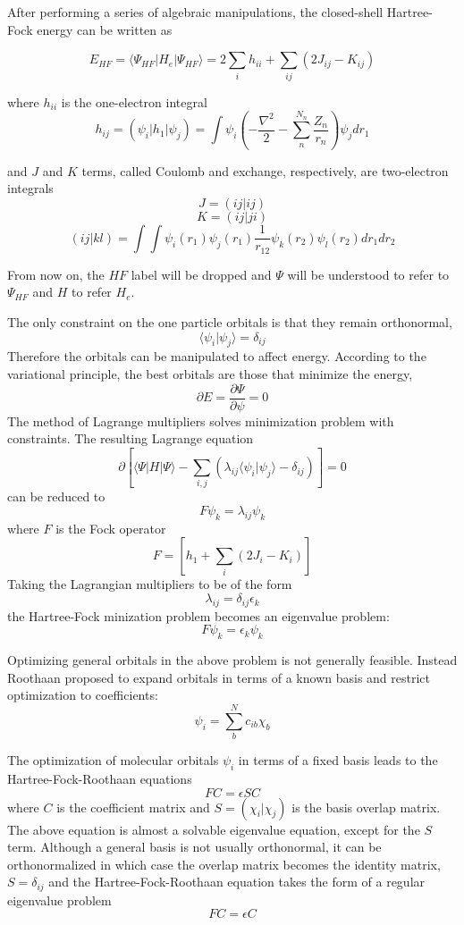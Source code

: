 \documentclass[12pt]{book} \usepackage[margin=1in]{geometry}
\newcommand{\bra}[1]{\langle #1|}
\newcommand{\ket}[1]{|#1\rangle}
\newcommand{\braket}[2]{\langle #1|#2\rangle}
\begin{document}
After performing a series of algebraic manipulations, the closed-shell
Hartree-Fock energy can be written as

$$E_{HF} =
\bra{\Psi_{HF}} H_e \ket{\Psi_{HF}} =
2 \sum_i h_{ii} + \sum_{ij} (2 J_{ij} - K_{ij})$$

where $h_{ii}$ is the one-electron integral
$$h_{ij} =
( \psi_i | h_1 | \psi_j ) = \int { \psi_i
( -\frac{\nabla^2}{2} - \sum_n^{N_n} \frac{Z_n}{r_{n}} )
 \psi_j dr_1 } $$

and $J$ and $K$ terms, called Coulomb and exchange, respectively, are
two-electron integrals
$$J = (ij|ij)$$
$$K = (ij|ji)$$
$$(ij|kl) = \int \int \psi_i(r_1) \psi_j(r_1
) \frac{1}{r_{12}}
\psi_k(r_2) \psi_l(r_2) dr_1 dr_2 $$
 

From now on, the $HF$ label will be dropped and $\Psi$ will be
understood to refer to $\Psi_{HF}$ and $H$ to refer $H_e$.


The only constraint on the one particle orbitals is that they remain
orthonormal,
$$\braket{\psi_i} {\psi_j} = \delta_{ij}$$
Therefore the orbitals can be manipulated to affect energy.
According to the variational principle, the best orbitals are those that
minimize the energy,
$$\partial{E} = \frac{\partial \Psi}{\partial \psi} = 0$$
The method of Lagrange multipliers solves minimization problem with
constraints.  The resulting Lagrange equation
$$ \partial [
\bra{\Psi} H \ket{\Psi} -
\sum_{i,j} ( \lambda_{ij} \braket{\psi_i}{\psi_j} - \delta_{ij} )
] = 0$$
can be reduced to
$$F \psi_k = \lambda_{ij} \psi_k$$
where $F$ is the Fock operator
$$F = [h_1 + \sum_i (2 J_i - K_i)]$$
Taking the Lagrangian multipliers to be of the form
$$\lambda_{ij} = \delta_{ij} \epsilon_k$$
the Hartree-Fock minization problem becomes an eigenvalue problem:
$$F \psi_k = \epsilon_k \psi_k$$

Optimizing general orbitals in the above problem is not generally
feasible.  Instead Roothaan \cite{roothaan1951new} proposed to expand
orbitals in terms of a known basis and restrict optimization to
coefficients:
$$\psi_i = \sum_b^{N} c_{ib} \chi_b$$

The optimization of molecular orbitals $\psi_i$ in terms of a fixed
basis leads to the Hartree-Fock-Roothaan equations
$$FC = \epsilon SC$$
where $C$ is the coefficient matrix and $S = (\chi_i|\chi_j)$ is the
basis overlap matrix.  The above equation is almost a solvable
eigenvalue equation, except for the $S$ term.  Although a general
basis is not usually orthonormal, it can be orthonormalized in which
case the overlap matrix becomes the identity matrix, $S = \delta_{ij}$
and the Hartree-Fock-Roothaan equation takes the form of a regular
eigenvalue problem
$$FC = \epsilon C$$
\end{document}
